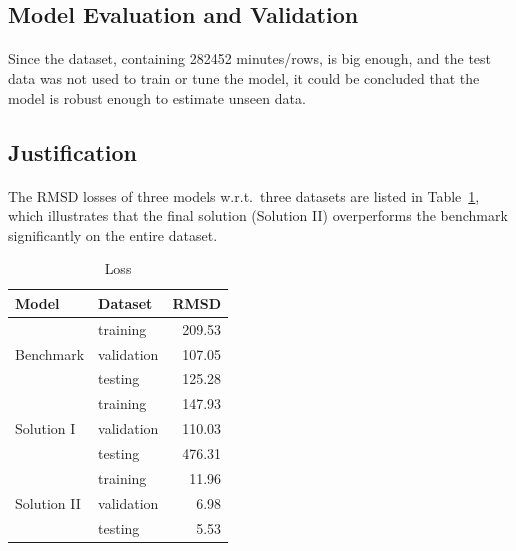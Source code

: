 \documentclass[12pt, letterpaper]{article}
\begin{document}
\subsection{Model Evaluation and Validation}

\paragraph{}
Since the dataset, containing 282452 minutes/rows, is big enough, and the test data was not used to train or tune the model, it could be concluded that the model is robust enough to estimate unseen data.

\subsection{Justification}



\paragraph{}
The RMSD losses of three models w.r.t.\ three datasets are listed in Table~\ref{table:loss}, which illustrates that the final solution (Solution II) overperforms the benchmark significantly on the entire dataset.

\begin{table}
    \centering
    \begin{tabular}{llr}
        \toprule
        Model     & Dataset &  RMSD \\
        \midrule
                    & training   & 209.53 \\
        Benchmark   & validation & 107.05 \\
                    & testing    & 125.28 \\
        \midrule
                    & training   & 147.93 \\
        Solution I  & validation & 110.03 \\
                    & testing    & 476.31 \\
        \midrule
                    & training   &  11.96 \\
        Solution II & validation &   6.98 \\
                    & testing    &   5.53 \\
        \bottomrule
    \end{tabular}
    \caption{Loss}%
    \label{table:loss}
\end{table}
\end{document}
